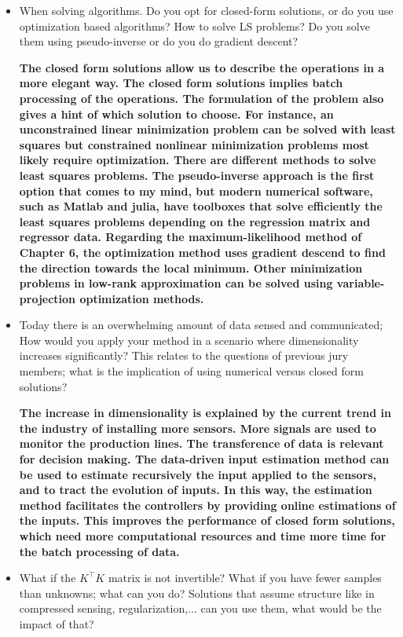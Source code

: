 \documentclass[11pt]{article}
\begin{document}
\begin{itemize}
	\item When solving algorithms. Do you opt for closed-form solutions, or do you use optimization based algorithms? How to solve LS problems? Do you solve them using pseudo-inverse or do you do gradient descent?
	
	{\bfseries The closed form solutions allow us to describe the operations in a more elegant way. The closed form solutions implies batch processing of the operations. The formulation of the problem also gives a hint of which solution to choose. For instance, an unconstrained linear minimization problem can be solved with least squares but constrained nonlinear minimization problems most likely require optimization. There are different methods to solve least squares problems. The pseudo-inverse approach is the first option that comes to my mind, but modern numerical software, such as Matlab and julia, have toolboxes that solve efficiently the least squares problems depending on the regression matrix and regressor data. Regarding the maximum-likelihood method of Chapter 6, the optimization method uses gradient descend to find the direction towards the local minimum. Other minimization problems in low-rank approximation can be solved using variable-projection optimization methods. }
	
	\item  Today there is an overwhelming amount of data sensed and communicated; How would you apply your method in a scenario where dimensionality increases significantly? This relates to the questions of previous jury members; what is the implication of using numerical versus closed form solutions?
	
	{\bfseries The increase in dimensionality is explained by the current trend in the industry of installing more sensors. More signals are used to monitor the production lines. The transference of data is relevant for decision making. The data-driven input estimation method can be used to estimate recursively the input applied to the sensors, and to tract the evolution of inputs. In this way, the estimation method facilitates the controllers by providing online estimations of the inputs. This improves the performance of closed form solutions, which need more computational resources and time more time for the batch processing of data.}
	
	\item  What if the $K^\top K$ matrix is not invertible? What if you have fewer samples than unknowns; what can you do? Solutions that assume structure like in compressed sensing, regularization,... can you use them, what would be the impact of that?
	

\end{itemize}
\end{document}
